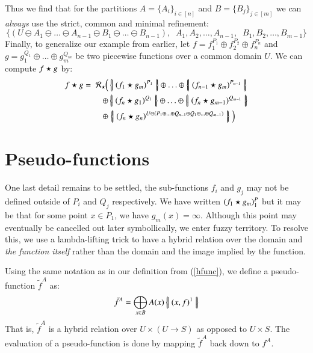 Thus we find that for the partitions $A = \{ A_i \}_{i \in [n]}$ and $B = \{ B_j \}_{j \in [m]}$ we can \emph{always}
use the strict, common and minimal refinement:
\begin{equation}
	\Big\{ (U \ominus A_1 \ominus \ldots \ominus A_{n-1} \ominus B_1 \ominus \ldots \ominus B_{n-1}), \;\;
	A_1, A_2, \ldots, A_{n-1}, \;\; B_1, B_2, \ldots, B_{m-1}
	\Big\}
\end{equation}
Finally, to generalize our example from earlier, let $f = f_1^{P_1} \oplus f_2^{P_2} \oplus f_n^{P_n}$
and  $g = g_1^{Q_1} \oplus \ldots \oplus g_m^{Q_m}$ be two piecewise functions over a common domain $U$.
We can compute $f \star g$ by:
\begin{align}
f \op g = \; \mathcal{R}_\op  \; & \!\!\! \left( \,
		\hset{ (f_1 \op g_m)^{P_1} } 
		\oplus \ldots \oplus 
		\hset{ (f_{n-1} \op g_m)^{P_{n-1}}} \right. \notag \\
	\oplus & 
		\hset{ (f_n \op g_1)^{Q_1} } 
		\oplus \ldots \oplus 
		\hset{ (f_n \op g_{m-1})^{Q_{m-1}}} \notag \\
	\oplus & \left. 
		\hset{ (f_n \op g_n)^{
			U \ominus (P_1 \oplus \ldots \oplus Q_{n-1} \oplus Q_1 \oplus \ldots \oplus Q_{m-1})}
		}
	\; \right)
\end{align}


%
%
\section{Pseudo-functions}

One last detail remains to be settled, the sub-functions $f_i$ and $g_j$ may not be defined outside of 
$P_i$ and $Q_j$ respectively.
We have written $(f_1 \star g_m)^P_1$ but it may be that for some point $x \in P_1$, we have $g_m(x) = \infty$.
Although this point may eventually be cancelled out later symbollically, we enter fuzzy territory.
To resolve this, we use a lambda-lifting trick to have a hybrid relation over the domain and \emph{the function itself}
rather than the domain and the image implied by the function.


\begin{definition}
	Using the same notation as in our definition from (\ref{hfunc}), we define a pseudo-function $\tilde{f}^A$ as:
	\begin{equation}
 		\tilde{f}^A = \bigoplus_{x \in B} A(x) \left\{ \! \left| \; (x,f)^1 \; \right| \! \right\}
	\end{equation}
	That is, $\tilde{f}^A$ is a hybrid relation over $U \times (U \to S)$ as opposed to $U \times S$.
	The evaluation of a pseudo-function is done by mapping $\tilde{f}^A$ back down to $f^A$.
\end{definition}

